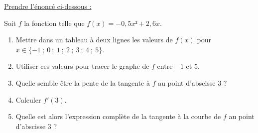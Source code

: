 \documentclass{automatisme}
\begin{document}
\begin{frame}
	\uline{Prendre l'énoncé ci-dessous :} \medskip

	Soit $f$ la fonction telle que $f(x) = -0,5x² + 2,6x$.

	\begin{enumerate}
		\item Mettre dans un tableau à deux lignes les valeurs de $f(x)$ pour $x ∈ \{-1\ ;\ 0\ ;\ 1\ ;\ 2\ ;\ 3\ ;\ 4\ ;\ 5\}$.
		\item Utiliser ces valeurs pour tracer le graphe de $f$ entre $-1$ et $5$.
		\item Quelle semble être la pente de la tangente à $f$ au point d'abscisse $3$ ?
		\item Calculer $f'(3)$.
		\item Quelle est alors l'expression complète de la tangente à la courbe de $f$ au point d'abscisse $3$ ?
	\end{enumerate}
\end{frame}
\end{document}
